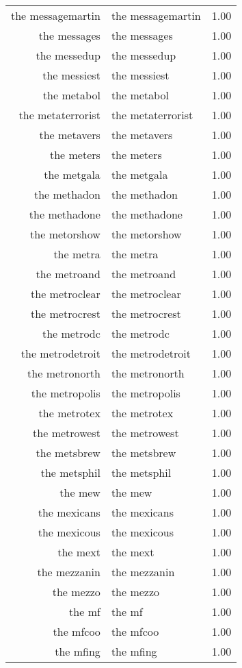 \begin{table}[ht]
\begin{tabular}{rlr}
  the messagemartin & the messagemartin & 1.00 \\ 
  the messages & the messages & 1.00 \\ 
  the messedup & the messedup & 1.00 \\ 
  the messiest & the messiest & 1.00 \\ 
  the metabol & the metabol & 1.00 \\ 
  the metaterrorist & the metaterrorist & 1.00 \\ 
  the metavers & the metavers & 1.00 \\ 
  the meters & the meters & 1.00 \\ 
  the metgala & the metgala & 1.00 \\ 
  the methadon & the methadon & 1.00 \\ 
  the methadone & the methadone & 1.00 \\ 
  the metorshow & the metorshow & 1.00 \\ 
  the metra & the metra & 1.00 \\ 
  the metroand & the metroand & 1.00 \\ 
  the metroclear & the metroclear & 1.00 \\ 
  the metrocrest & the metrocrest & 1.00 \\ 
  the metrodc & the metrodc & 1.00 \\ 
  the metrodetroit & the metrodetroit & 1.00 \\ 
  the metronorth & the metronorth & 1.00 \\ 
  the metropolis & the metropolis & 1.00 \\ 
  the metrotex & the metrotex & 1.00 \\ 
  the metrowest & the metrowest & 1.00 \\ 
  the metsbrew & the metsbrew & 1.00 \\ 
  the metsphil & the metsphil & 1.00 \\ 
  the mew & the mew & 1.00 \\ 
  the mexicans & the mexicans & 1.00 \\ 
  the mexicous & the mexicous & 1.00 \\ 
  the mext & the mext & 1.00 \\ 
  the mezzanin & the mezzanin & 1.00 \\ 
  the mezzo & the mezzo & 1.00 \\ 
  the mf & the mf & 1.00 \\ 
  the mfcoo & the mfcoo & 1.00 \\ 
  the mfing & the mfing & 1.00 \\ 

\end{tabular}
\end{table}
